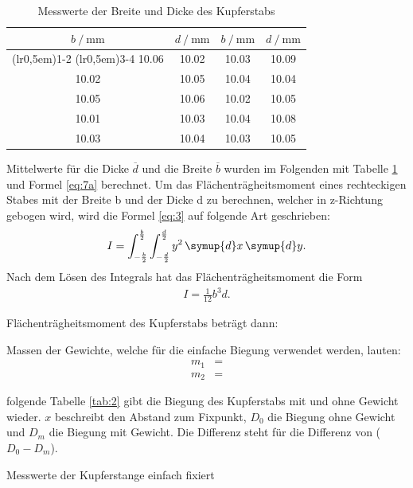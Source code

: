 \begin{table}[H]
\centering
    \begin{tabular}{c c c c}
    \toprule
        {$b \:/\: \si{\milli\meter}$} & {$d \:/\: \si{\milli\meter}$} & {$b \:/\: \si{\milli\meter}$} & {$d \:/\: \si{\milli\meter}$}\\
        \cmidrule(lr{0,5em}){1-2} \cmidrule(lr{0,5em}){3-4}
        10.06 & 10.02 & 10.03 & 10.09\\
        10.02 & 10.05 & 10.04 & 10.04\\
        10.05 & 10.06 & 10.02 & 10.05\\
        10.01 & 10.03 & 10.04 & 10.08\\
        10.03 & 10.04 & 10.03 & 10.05\\
    \bottomrule
    \end{tabular}
\caption{Messwerte der Breite und Dicke des Kupferstabs}
\label{tab:1}
\end{table}

\justifying Mittelwerte für die Dicke $\overline{d}$ und die Breite $\overline{b}$ wurden im Folgenden mit Tabelle \ref{tab:1} 
 und Formel \eqref{eq:7a} berechnet. Um das Flächenträgheitsmoment eines rechteckigen Stabes mit der Breite b und der
Dicke d zu berechnen, welcher in z-Richtung gebogen wird, wird die Formel \eqref{eq:3} auf folgende Art
geschrieben:
\begin{align}
    I=\int_{-\frac{b}{2}}^{\frac{b}{2}} \int_{-\frac{d}{2}}^{\frac{d}{2}} y^2 \, \symup{d}x \, \symup{d}y \label{eq:9}.
\end{align}
Nach dem Lösen des Integrals hat das Flächenträgheitsmoment die Form
\begin{align}
     I=\frac{1}{12} b^3d. \label{eq:10}
\end{align}

\justifying Flächenträgheitsmoment des Kupferstabs beträgt dann:


\justifying Massen der Gewichte, welche für die einfache Biegung verwendet werden, lauten:
\begin{subequations}\label{eq:11}
\begin{align}
    m_1 &= \text{} \label{eq:11a}\\
    m_2 &= \text{} \label{eq:11b}
\end{align}
\end{subequations}

\justifying folgende Tabelle \ref{tab:2} gibt die Biegung des Kupferstabs mit und ohne Gewicht wieder. $x$ beschreibt den Abstand zum Fixpunkt, $D_0$
die Biegung ohne Gewicht und $D_m$ die Biegung mit Gewicht. Die Differenz steht für die Differenz von ($D_0-D_m$).
\begin{table}[H]
    \centering
    
    \caption{Messwerte der Kupferstange einfach fixiert}
    \label{tab:2}
\end{table}

